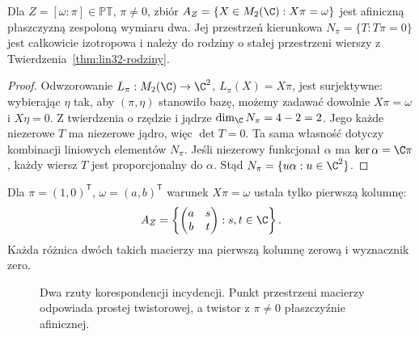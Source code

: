 \begin{stwierdzenie}
\label{prop:lin32-alfa}
Dla $Z=[\omega:\pi]\in\mathbb{PT}$,
$\pi\ne0$, zbiór
$A_Z=\{X\in M_2(\C):X\pi=\omega\}$
jest afiniczną płaszczyzną zespoloną
wymiaru dwa. Jej przestrzeń kierunkowa
$N_\pi=\{T:T\pi=0\}$ jest całkowicie izotropowa
i należy do rodziny o stałej przestrzeni
wierszy z Twierdzenia~\ref{thm:lin32-rodziny}.
\end{stwierdzenie}
\begin{proof}
Odwzorowanie $L_\pi:M_2(\C)\to\C^2$,
$L_\pi(X)=X\pi$, jest surjektywne:
wybierając $\eta$ tak, aby $(\pi,\eta)$
stanowiło bazę, możemy zadawać dowolnie
$X\pi=\omega$ i $X\eta=0$.
Z twierdzenia o rzędzie i jądrze
$\dim_\C N_\pi=4-2=2$.
Jego każde niezerowe $T$ ma niezerowe
jądro, więc $\det T=0$. Ta sama własność
dotyczy kombinacji liniowych elementów $N_\pi$.
Jeśli niezerowy funkcjonał $\alpha$ ma
$\ker\alpha=\C\pi$, każdy wiersz $T$
jest proporcjonalny do $\alpha$.
Stąd $N_\pi=\{u\alpha:u\in\C^2\}$.
\end{proof}

\begin{przyklad}
\label{prz:lin32-alfa}
Dla $\pi=(1,0)^{\mathsf T}$,
$\omega=(a,b)^{\mathsf T}$ warunek
$X\pi=\omega$ ustala tylko pierwszą kolumnę:
\[
 A_Z=\left\{\begin{pmatrix}a&s\\b&t\end{pmatrix}
                 :s,t\in\C\right\}.
\]
Każda różnica dwóch takich macierzy
ma pierwszą kolumnę zerową i wyznacznik zero.
\end{przyklad}

\begin{figure}[!htbp]
\centering
{}
\caption{Dwa rzuty korespondencji incydencji.
Punkt przestrzeni macierzy odpowiada prostej twistorowej,
a twistor z $\pi\ne0$ płaszczyźnie afinicznej.}
\label{fig:lin32-incydencja}
\end{figure}

